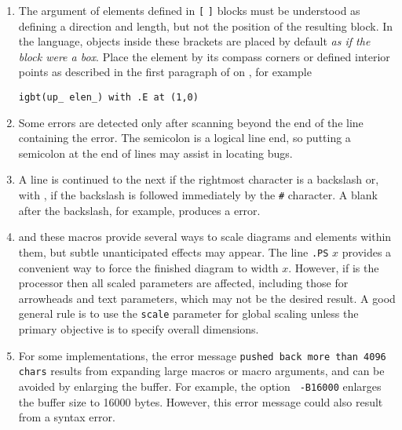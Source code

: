 \begin{enumerate}
{\tt resistor(up\_ from A to B); rlabel(,R\_1)}

\noindent%
rather than 

{\tt resistor(from A to B); rlabel(,R\_1),}

\noindent%
which produce different results if the last-defined drawing direction is not
{\tt up}.  It might be possible to change the label macros to avoid this problem
without sacrificing ease of use.

\item
{}
  The \linespec argument of elements defined in {\tt[} {\tt]}
  blocks must be understood as defining a direction and length, but
  not the position of the resulting block.
  In the \pic language, objects inside these brackets are placed by
  default {\em as if the block were a box}.  Place the
  element by its compass corners or defined interior points
  as described in the first paragraph of  on
  , for example  
  
{\tt igbt(up\_ elen\_) with .E at (1,0)}

\item
{}
 Some errors are detected only after scanning
  beyond the end of the line containing the error.  The semicolon
  is a logical line end, so putting a semicolon at the end of lines may
  assist in locating bugs. 

\item
{}
 A line is continued to the next if the
  rightmost character is a backslash or, with \dpic, if the backslash is
  followed immediately by the {\tt \#} character.
  A blank after the backslash, for example, produces a \pic error.

\item
{}
 \Pic and these macros provide several ways to scale
  diagrams and elements within them, but subtle unanticipated effects
  may appear.  The line {\tt.PS} $x$ provides a convenient way to force
  the finished diagram to width $x.$  However, if \gpic is the
  \pic processor then all scaled parameters are affected, including those
  for arrowheads and text parameters, which may not be the desired
  result.  A good general rule is to use the {\tt scale} parameter for
  global scaling unless the primary objective is to specify overall
  dimensions.

\item
{}
 For some \Mfour implementations,
  the error message {\tt pushed back more than 4096 chars}
  results from expanding large macros or macro arguments, and can be
  avoided by enlarging the buffer.  For example, the option {\tt
  -B16000} enlarges the buffer size to 16000 bytes.  However, this
  error message could also result from a syntax error.


\end{enumerate}
